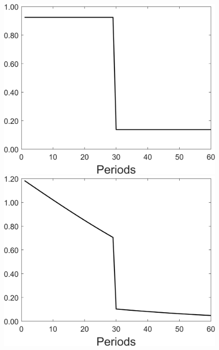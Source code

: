 \begin{figure}[h!!]
\begin{minipage}[]{0.32\textwidth}
	\end{minipage}
	\begin{minipage}[]{0.32\textwidth}
		\includegraphics[width=1\textwidth]{../codding_model/Own/figures/Rep_agent/staticonlyRam_separate_yd_periods59_eppsilon0.40_zeta1.40_Ad08_Ac04_thetac0.70_thetad0.56_HetGrowth1_tauul0.181_util0_withtarget1_lgd0.png}
	\end{minipage}
	\begin{minipage}[]{0.32\textwidth}
		\includegraphics[width=1\textwidth]{../codding_model/Own/figures/Rep_agent/staticonlyRam_separate_xd_periods59_eppsilon0.40_zeta1.40_Ad08_Ac04_thetac0.70_thetad0.56_HetGrowth1_tauul0.181_util0_withtarget1_lgd0.png}

\end{minipage}
\end{figure}
